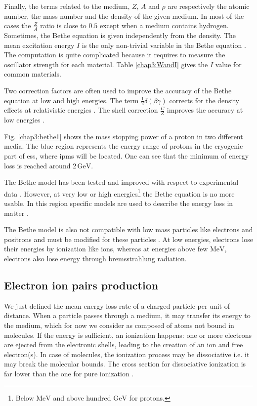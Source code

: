 \begin{refsection}
  Finally, the terms related to the medium, \(Z\), \(A\) and \(\rho\) are respectively the atomic number, the mass number and the density of the given medium. In most of the cases the \(\frac{Z}{A}\) ratio is close to \(0.5\) except when a medium contains hydrogen. Sometimes, the Bethe equation is given independently from the density.
  The mean excitation energy \(I\) is the only non-trivial variable in the Bethe equation \cite{Berger1984,Berger1993}. The computation is quite complicated because it requires to measure the oscillator strength for each material. Table \ref{chap3:WandI} gives the \(I\) value for common materials.

  Two correction factors are often used to improve the accuracy of the Bethe equation at low and high energies. The term \(\frac{1}{2}\delta(\beta \gamma)\) corrects for the density effects at relativistic energies \cite{Sternheimer1984}. The shell correction \(\frac{C}{Z}\) improves the accuracy at low energies \cite{Bichsel2002}.

  

  Fig. \ref{chap3:bethe1} shows the mass stopping power of a proton in two different media. The blue region represents the energy range of protons in the cryogenic part of \acrshort{ess}, where \acrshort{ipm}s will be located. One can see that the minimum of energy loss is reached around \(2\,\mathrm{GeV}\).

  The Bethe model has been tested and improved with respect to experimental data \cite{Porter1990}. However, at very low or high energies\footnote{Below $\mathrm{MeV}$ and above hundred $\mathrm{GeV}$ for protons.} the Bethe equation is no more usable. In this region specific models are used to describe the energy loss in matter \cite{Ziegler1985, Allison1980}.

  The Bethe model is also not compatible with low mass particles like electrons and positrons and must be modified for these particles \cite{Rieke1972}\cite[p. 452]{Tanabashi2018}. At low energies, electrons lose their energies by ionization like ions, whereas at energies above few \(\mathrm{MeV}\), electrons also lose energy through bremsstrahlung radiation.

  \subsection{Electron ion pairs production}
  We just defined the mean energy loss rate of a charged particle per unit of distance. When a particle passes through a medium, it may transfer its energy to the medium, which for now we consider as composed of atoms not bound in molecules. If the energy is sufficient, an ionization happens: one or more electrons are ejected from the electronic shells, leading to the creation of an ion and free electron(s). In case of molecules, the ionization process may be dissociative i.e. it may break the molecular bounds. The cross section for dissociative ionization is far lower than the one for pure ionization \cite{Dimopoulou2004}.


\end{refsection}
